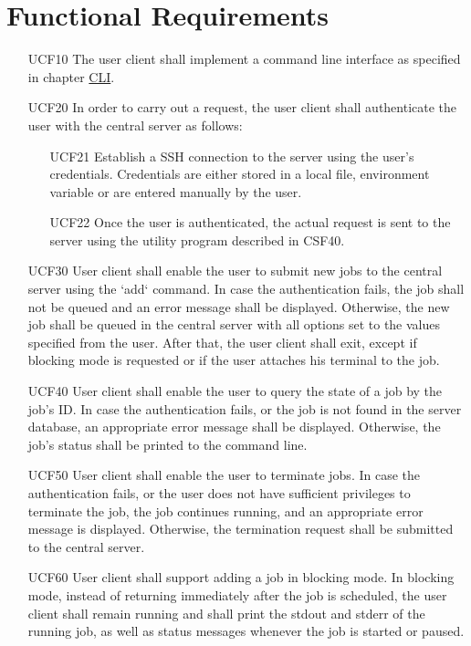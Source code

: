 \section{Functional Requirements}
\begin{itemize}
  \item[UCF10] The user client shall implement a command line interface as specified in chapter \hyperref[CLI]{CLI}.
  \item[UCF20] In order to carry out a request, the user client shall authenticate the user with the central server as follows:
    \begin{enumerate}
      \item[UCF21] Establish a \gls{SSH} connection to the server using the user's credentials.
        Credentials are either stored in a local file, environment variable or are entered manually by the user.
      \item[UCF22] Once the user is authenticated, the actual request is sent to the server using the utility program described in CSF40.
    \end{enumerate}

  \item[UCF30] User client shall enable the user to submit new jobs to the central server using the `add` command.
    In case the authentication fails, the job shall not be queued and an error message shall be displayed.
    Otherwise, the new job shall be queued in the central server with all options set to the values specified from the user.
    After that, the user client shall exit, except if blocking mode is requested or if the user attaches his terminal to the job.

  \item[UCF40] User client shall enable the user to query the state of a job by the job's ID.
    In case the authentication fails, or the job is not found in the server database, an appropriate error message shall be displayed.
    Otherwise, the job's status shall be printed to the command line.

  \item[UCF50] User client shall enable the user to terminate jobs.
    In case the authentication fails, or the user does not have sufficient privileges to terminate the job,
    the job continues running, and an appropriate error message is displayed.
    Otherwise, the termination request shall be submitted to the central server.

  \item[UCF60] User client shall support adding a job in blocking mode.
    In blocking mode, instead of returning immediately after the job is scheduled, the user client shall remain running
    and shall print the stdout and stderr of the running job, as well as status messages whenever the job is started or paused.


\end{itemize}
